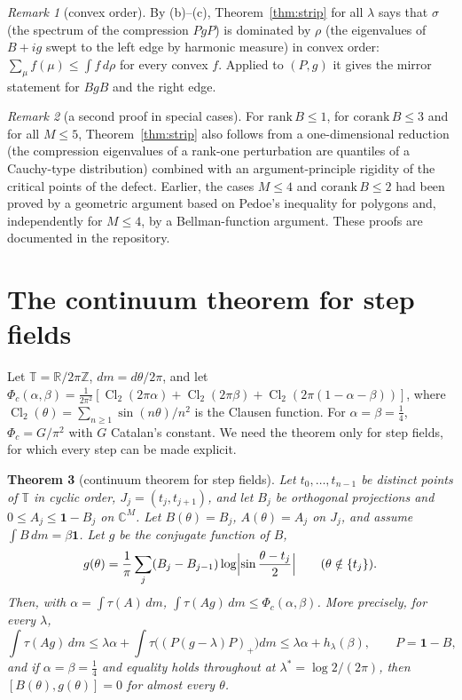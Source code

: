 \documentclass[11pt]{amsart}
\newtheorem{theorem}{Theorem}[section]
\theoremstyle{definition}
\theoremstyle{remark}
\newtheorem{remark}[theorem]{Remark}
\numberwithin{equation}{section}
\newcommand{\R}{\mathbb{R}}
\newcommand{\C}{\mathbb{C}}
\newcommand{\Z}{\mathbb{Z}}
\newcommand{\T}{\mathbb{T}}
\newcommand{\Cl}{\operatorname{Cl}_2}
\newcommand{\one}{\mathbf{1}}
\begin{document}
\begin{remark}[convex order]
By (b)--(c), Theorem~\ref{thm:strip} for all $\lambda$ says that $\sigma$ (the spectrum of the compression $PgP$) is
dominated by $\rho$ (the eigenvalues of $B+ig$ swept to the left edge by harmonic measure) in convex order:
$\sum_{\mu}f(\mu)\le\int f\,d\rho$ for every convex $f$. Applied to $(P,g)$ it gives the mirror statement for $BgB$ and
the right edge.
\end{remark}

\begin{remark}[a second proof in special cases]
For $\mathrm{rank}\,B\le1$, for $\mathrm{corank}\,B\le3$ and for all $M\le5$, Theorem~\ref{thm:strip} also follows
from a one-dimensional reduction (the compression eigenvalues of a rank-one perturbation are quantiles of a Cauchy-type
distribution) combined with an argument-principle rigidity of the critical points of the defect. Earlier, the cases
$M\le4$ and $\mathrm{corank}\,B\le2$ had been proved by a geometric argument based on Pedoe's inequality for polygons and,
independently for $M\le4$, by a Bellman-function argument. These proofs are documented in the repository\cite{repoOQP}.
\end{remark}

\section{The continuum theorem for step fields}\label{sec:cont}

Let $\T=\R/2\pi\Z$, $dm=d\theta/2\pi$, and let $\Phi_c(\alpha,\beta)=\frac1{2\pi^2}[\Cl(2\pi\alpha)+\Cl(2\pi\beta)+\Cl(2\pi(1-\alpha-\beta))]$,
where $\Cl(\theta)=\sum_{n\ge1}\sin(n\theta)/n^2$ is the Clausen function. For $\alpha=\beta=\frac14$,
$\Phi_c=G/\pi^2$ with $G$ Catalan's constant. We need the theorem only for step fields, for which every step can be
made explicit.

\begin{theorem}[continuum theorem for step fields]\label{thm:cont}
Let $t_0,\dots,t_{n-1}$ be distinct points of $\T$ in cyclic order, $J_j=(t_j,t_{j+1})$, and let $B_j$ be orthogonal
projections and $0\le A_j\le\one-B_j$ on $\C^M$. Let $B(\theta)=B_j$, $A(\theta)=A_j$ on $J_j$, and assume
$\int B\,dm=\beta\one$. Let $g$ be the conjugate function of $B$,
\[
g(\theta)=\frac1\pi\sum_j(B_j-B_{j-1})\log\Bigl|\sin\frac{\theta-t_j}{2}\Bigr|\qquad(\theta\notin\{t_j\}).
\]
Then, with $\alpha=\int\tau(A)\,dm$, $\int\tau(Ag)\,dm\le\Phi_c(\alpha,\beta)$. More precisely, for every $\lambda$,
\begin{equation}\label{eq:chain}
\int\tau(Ag)\,dm\le\lambda\alpha+\int\tau\bigl((P(g-\lambda)P)_+\bigr)dm\le\lambda\alpha+h_\lambda(\beta),\qquad P=\one-B,
\end{equation}
and if $\alpha=\beta=\frac14$ and equality holds throughout at $\lambda^*=\log2/(2\pi)$, then $[B(\theta),g(\theta)]=0$ for
almost every $\theta$.
\end{theorem}
\end{document}
